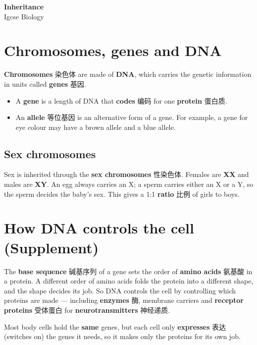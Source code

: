 \documentclass[11pt]{article}
\begin{document}
\begin{center}
  {\LARGE\bfseries Inheritance}\\[0.35em]
  {\large Igcse Biology}
\end{center}
\vspace{0.6em}

\section*{Chromosomes, genes and DNA}

\textbf{Chromosomes} 染色体 are made of \textbf{DNA}, which carries the genetic information in units called \textbf{genes} 基因.

\begin{itemize}
\item A \textbf{gene} is a length of DNA that \textbf{codes} 编码 for one \textbf{protein} 蛋白质.

\item An \textbf{allele} 等位基因 is an alternative form of a gene. For example, a gene for eye colour may have a brown allele and a blue allele.

\end{itemize}

\subsection*{Sex chromosomes}

Sex is inherited through the \textbf{sex chromosomes} 性染色体. Females are \textbf{XX} and males are \textbf{XY}. An egg always carries an X; a sperm carries either an X or a Y, so the sperm decides the baby's sex. This gives a 1:1 \textbf{ratio} 比例 of girls to boys.

\section*{How DNA controls the cell (Supplement)}

The \textbf{base sequence} 碱基序列 of a gene sets the order of \textbf{amino acids} 氨基酸 in a protein. A different order of amino acids folds the protein into a different shape, and the shape decides its job. So DNA controls the cell by controlling which proteins are made — including \textbf{enzymes} 酶, membrane carriers and \textbf{receptor proteins} 受体蛋白 for \textbf{neurotransmitters} 神经递质.

Most body cells hold the \textbf{same} genes, but each cell only \textbf{expresses} 表达 (switches on) the genes it needs, so it makes only the proteins for its own job.
\end{document}
